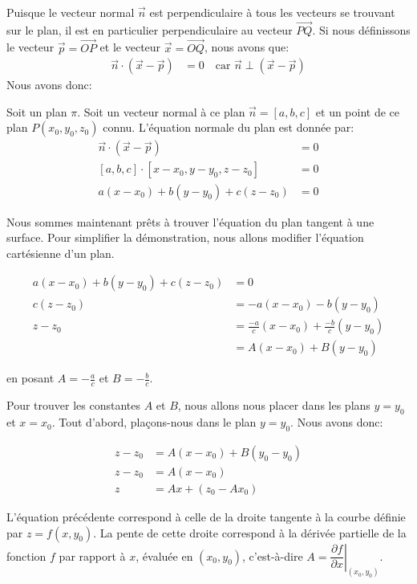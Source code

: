 \documentclass[]{book}
\theoremstyle{definition}
\theoremstyle{definition}
\theoremstyle{definition}
\theoremstyle{remark}
\let\BeginKnitrBlock\begin \let\EndKnitrBlock\end
\begin{document}
Puisque le vecteur normal \(\vec n\) est perpendiculaire à tous les
vecteurs se trouvant sur le plan, il est en particulier perpendiculaire
au vecteur \(\overrightarrow{PQ}\). Si nous définissons le vecteur
\(\vec p = \overrightarrow{OP}\) et le vecteur
\(\vec x=\overrightarrow{OQ}\), nous avons que: \begin{align*}
\vec n \cdot (\vec x - \vec p) &= 0 \quad \text{car $\vec n \perp (\vec x - \vec p)$}
\end{align*} Nous avons donc:

\BeginKnitrBlock{definition}[L'équation cartésienne d'un plan]
\protect\hypertarget{def:unnamed-chunk-170}{}{\label{def:unnamed-chunk-170}
{} }Soit un plan \(\pi\).
Soit un vecteur normal à ce plan \(\vec n=[a,b,c]\) et un point de ce
plan \(P(x_0,y_0,z_0)\) connu. L'équation normale du plan est donnée
par: \begin{align*}
\vec n \cdot (\vec x - \vec p) &= 0 \\
[a,b,c] \cdot [x-x_0,y-y_0,z-z_0] &= 0 \\
a(x-x_0)+b(y-y_0)+c(z-z_0) &= 0
\end{align*}
\EndKnitrBlock{definition}

Nous sommes maintenant prêts à trouver l'équation du plan tangent à une
surface. Pour simplifier la démonstration, nous allons modifier
l'équation cartésienne d'un plan.

\begin{align*}
a(x-x_0)+b(y-y_0)+c(z-z_0) &= 0 \\
c(z-z_0)  &= -a(x-x_0)-b(y-y_0) \\
z-z_0 &= \frac{-a}{c}(x-x_0)+\frac{-b}{c}(y-y_0) \\
&= A(x-x_0)+B(y-y_0)
\end{align*}

en posant \(A=-\frac{a}{c}\) et \(B=-\frac{b}{c}\).

Pour trouver les constantes \(A\) et \(B\), nous allons nous placer dans
les plans \(y=y_0\) et \(x=x_0\). Tout d'abord, plaçons-nous dans le
plan \(y=y_0\). Nous avons donc:

\begin{align*}
z-z_0 &= A(x-x_0)+B(y_0-y_0) \\
z-z_0 &= A(x-x_0) \\
z &= Ax +(z_0-Ax_0)
\end{align*}

L'équation précédente correspond à celle de la droite tangente à la
courbe définie par \(z=f(x,y_0)\). La pente de cette droite correspond à
la dérivée partielle de la fonction \(f\) par rapport à \(x\), évaluée
en \((x_0,y_0)\), c'est-à-dire
\(A=\left.\dfrac{\partial f}{\partial x}\right|_{(x_0,y_0)}\).
\end{document}
